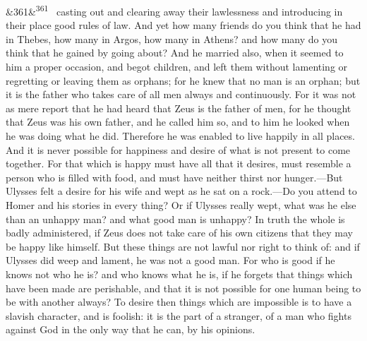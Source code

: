 \documentclass[12pt]{article}
\newcommand{\para}[1][]{\par\noindent\ifx&#1&\else\textsuperscript{\footnotesize #1}~\fi}
\begin{document}
\para[361] casting out and clearing away their lawlessness and introducing in their place good rules of law. And yet how many friends do you think that he had in Thebes, how many in Argos, how many in Athens? and how many do you think that he gained by going about? And he married also, when it seemed to him a proper occasion, and begot children, and left them without lamenting or regretting or leaving them as orphans; for he knew that no man is an orphan; but it is the father who takes care of all men always and continuously. For it was not as mere report that he had heard that Zeus is the father of men, for he thought that Zeus was his own father, and he called him so, and to him he looked when he was doing what he did. Therefore he was enabled to live happily in all places. And it is never possible for happiness and desire of what is not present to come together. For that which is happy must have all that it desires, must resemble a person who is filled with food, and must have neither thirst nor hunger.—But Ulysses felt a desire for his wife and wept as he sat on a rock.—Do you attend to Homer and his stories in every thing? Or if Ulysses really wept, what was he else than an unhappy man? and what good man is unhappy? In truth the whole is badly administered, if Zeus does not take care of his own citizens that they may be happy like himself. But these things are not lawful nor right to think of: and if Ulysses did weep and lament, he was not a good man. For who is good if he knows not who he is? and who knows what he is, if he forgets that things which have been made are perishable, and that it is not possible for one human being to be with another always? To desire then things which are impossible is to have a slavish character, and is foolish: it is the part of a stranger, of a man who fights against God in the only way that he can, by his opinions.
\end{document}
